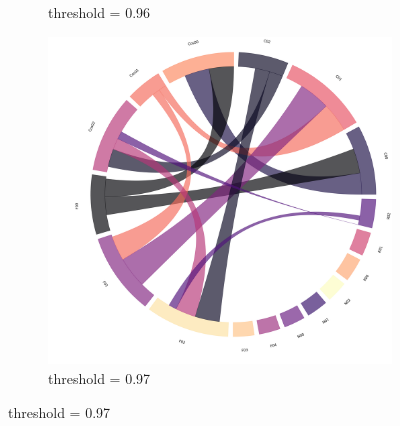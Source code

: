 \begin{figure}[!h]
\begin{subfigure}[b]{0.3\linewidth}
		\caption{threshold = 0.96}
	\end{subfigure}
	\hfill
	\begin{subfigure}[b]{0.3\linewidth}
		\includegraphics[width=\linewidth]{figures/chords/chord_swap_ensemble1000_RCN5333300_097.png}
		\caption{threshold = 0.97}
	\end{subfigure}
	

\end{figure}
